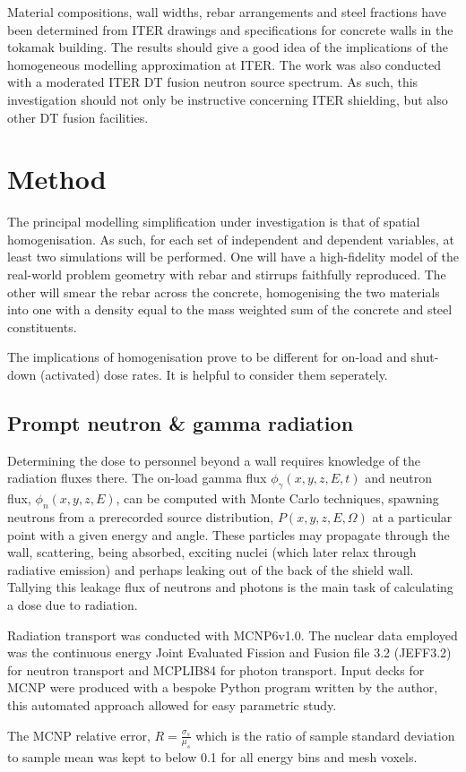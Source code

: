 Material compositions, wall widths, rebar arrangements and steel fractions have been determined from ITER drawings and specifications for concrete walls in the tokamak building. The results should give a good idea of the implications of the homogeneous modelling approximation at ITER. The work was also conducted with a moderated ITER DT fusion neutron source spectrum. As such, this investigation should not only be instructive concerning ITER shielding, but also other DT fusion facilities.

\section{Method}

The principal modelling simplification under investigation is that of spatial homogenisation. As such, for each set of independent and dependent variables, at least two simulations will be performed. One will have a high-fidelity model of the real-world problem geometry with rebar and stirrups faithfully reproduced. The other will smear the rebar across the concrete, homogenising the two materials into one with a density equal to the mass weighted sum of the concrete and steel constituents. \par
The implications of homogenisation prove to be different for on-load and shut-down (activated) dose rates. It is helpful to consider them seperately.

\subsection{Prompt neutron \& gamma radiation}

Determining the dose to personnel beyond a wall requires knowledge of the radiation fluxes there. The on-load gamma flux $\phi_{\gamma}(x,y,z,E,t)$ and neutron flux, $\phi_{n}(x,y,z,E)$, can be computed with Monte Carlo techniques, spawning neutrons from a prerecorded source distribution, $P(x,y,z,E,\Omega)$ at a particular point with a given energy and angle. These particles may propagate through the wall, scattering, being absorbed, exciting nuclei (which later relax through radiative emission) and perhaps leaking out of the back of the shield wall. Tallying this leakage flux of neutrons and photons is the main task of calculating a dose due to radiation.\par
Radiation transport was conducted with MCNP6v1.0. The nuclear data employed was the continuous energy Joint Evaluated Fission and Fusion file 3.2 (JEFF3.2) for neutron transport and MCPLIB84 for photon transport. Input decks for MCNP were produced with a bespoke Python program written by the author, this automated approach allowed for easy parametric study. \par
The MCNP relative error, $R = \frac{\sigma_{s}}{\mu_{s}}$ which is the ratio of sample standard deviation to sample mean was kept to below 0.1 for all energy bins and mesh voxels.

